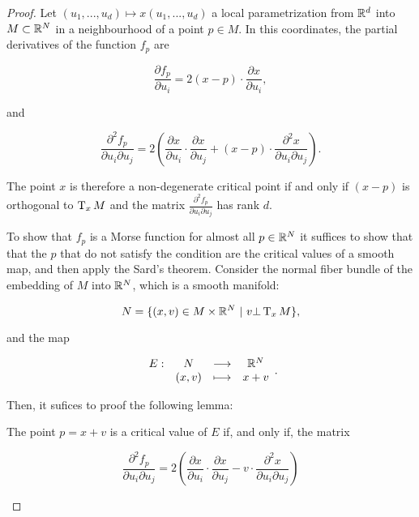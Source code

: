 \begin{proof} Let $(u_1,...,u_d) \mapsto x(u_1,...,u_d)$ a local parametrization from $\mathbb{R}^d$ into $M \subset \mathbb{R}^N$ in a neighbourhood of a point $p \in M$. In this coordinates, the partial derivatives of the function $f_p$ are

\begin{displaymath}
\frac{\partial f_p}{\partial u_i} = 2(x-p) \cdot \frac{\partial x}{\partial u_i} ,
\end{displaymath}

and

\begin{displaymath}
\frac{\partial^2 f_p}{\partial u_i \partial u_j} = 2 \left(\frac{\partial x}{\partial u_i} \cdot \frac{\partial x}{\partial u_j} + (x-p) \cdot \frac{\partial^2 x}{\partial u_i \partial u_j} \right) .
\end{displaymath}

The point $x$ is therefore a non-degenerate critical point if and only if $(x-p)$ is orthogonal to $\operatorname T_xM$ and the matrix $\frac{\partial^2 f_p}{\partial u_i \partial u_j}$ has rank $d$.

To show that $f_p$ is a Morse function for almost all $p \in \mathbb{R}^N$ it suffices to show that that the $p$ that do not satisfy the condition are the critical values of a smooth map, and then apply the Sard's theorem. Consider the normal fiber bundle of the embedding of $M$ into $\mathbb{R}^N$, which is a smooth manifold:

\begin{displaymath}
N = \{(x,v) \in M \times \mathbb{R}^N \ | \ v \bot \operatorname T_xM \} ,
\end{displaymath}

and the map

\begin{displaymath}
\begin{array}{rccc} E : & N & \longrightarrow & \mathbb{R}^N \\ & (x,v) & \longmapsto & x+v \end{array} .
\end{displaymath}

Then, it sufices to proof the following lemma:

\begin{lema}
The point $p = x + v$ is a critical value of $E$ if, and only if, the matrix

\begin{displaymath}
\frac{\partial^2 f_p}{\partial u_i \partial u_j} = 2 \left( \frac{\partial x}{\partial u_i} \cdot \frac{\partial x}{\partial u_j} - v \cdot \frac{\partial^2 x}{\partial u_i \partial u_j} \right)
\end{displaymath}


\end{lema}
\end{proof}
